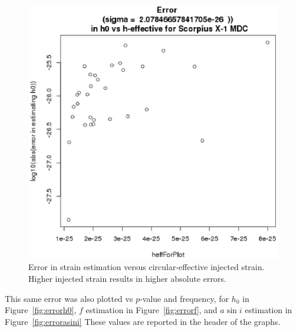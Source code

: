 \begin{figure}
\begin{center}
\includegraphics[trim=0 10 10 15, clip, width=0.72\paperwidth,height=0.48\paperheight]{detectedHerrVsHeffective.eps}
\caption{ Error in strain estimation versus circular-effective injected strain. Higher injected strain results in higher absolute errors.
\label{fig:detectedherrvsheffective}} 
\end{center}
\end{figure}

This same error was also plotted vs $p$-value and frequency, for $h_0$ in Figure~\ref{fig:errorh0}, $f$ estimation in Figure~\ref{fig:errorf}, and $a \sin i$ estimation in Figure~\ref{fig:errorasini} 
These values are reported in the header of the graphs.

